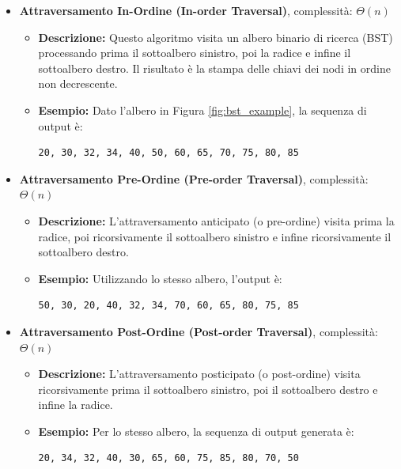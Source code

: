 \begin{itemize}
    \item \textbf{Attraversamento In-Ordine (In-order Traversal)}, complessità: $\Theta(n)$
    \begin{itemize}
        \item \textbf{Descrizione:} Questo algoritmo visita un albero binario di ricerca (BST) processando prima il sottoalbero sinistro, poi la radice e infine il sottoalbero destro. Il risultato è la stampa delle chiavi dei nodi in ordine non decrescente.
        \item \textbf{Esempio:} Dato l'albero in Figura \ref{fig:bst_example}, la sequenza di output è:
        \begin{verbatim}
20, 30, 32, 34, 40, 50, 60, 65, 70, 75, 80, 85
        \end{verbatim}
    \end{itemize}

    \item \textbf{Attraversamento Pre-Ordine (Pre-order Traversal)}, complessità: $\Theta(n)$
    \begin{itemize}
        \item \textbf{Descrizione:} L'attraversamento anticipato (o pre-ordine) visita prima la radice, poi ricorsivamente il sottoalbero sinistro e infine ricorsivamente il sottoalbero destro.
        \item \textbf{Esempio:} Utilizzando lo stesso albero, l'output è:
        \begin{verbatim}
50, 30, 20, 40, 32, 34, 70, 60, 65, 80, 75, 85
        \end{verbatim}
    \end{itemize}

    \item \textbf{Attraversamento Post-Ordine (Post-order Traversal)}, complessità: $\Theta(n)$
    \begin{itemize}
        \item \textbf{Descrizione:} L'attraversamento posticipato (o post-ordine) visita ricorsivamente prima il sottoalbero sinistro, poi il sottoalbero destro e infine la radice.
        \item \textbf{Esempio:} Per lo stesso albero, la sequenza di output generata è:
        \begin{verbatim}
20, 34, 32, 40, 30, 65, 60, 75, 85, 80, 70, 50
        \end{verbatim}
    \end{itemize}


\end{itemize}
